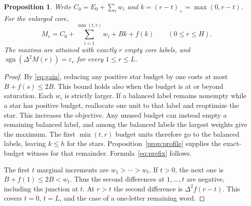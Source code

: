 \documentclass[11pt]{article}
\newtheorem{proposition}[theorem]{Proposition}
\theoremstyle{definition}\newtheorem{example}[theorem]{Example}
\newcommand{\sig}{\operatorname{sgn}}
\newcommand{\Dtwo}{\Delta^2}
\begin{document}
\begin{proposition}\label{prop:prefix}
Write $C_0=E_0+\sum_i w_i$ and $k=(r-t)_+=\max(0,r-t)$. For the enlarged core,
\begin{equation}\label{eq:prefix}
 M_r=C_0+\sum_{i=1}^{\min(t,r)}w_i+Bk+f(k)\qquad(0\le r\le H).
\end{equation}
The maxima are attained with exactly $r$ empty core labels, and $\sig(\Dtwo M(r))=\varepsilon_r$ for every $1\le r\le L$.
\end{proposition}
\begin{proof}
By \eqref{eq:gain}, reducing any positive star budget by one costs at most $B+f(s)\le2B$. This bound holds also when the budget is at or beyond saturation. Each $w_i$ is strictly larger. If a balanced label remains nonempty while a star has positive budget, reallocate one unit to that label and reoptimize the star. This increases the objective. Any unused budget can instead empty a remaining balanced label, and among the balanced labels the largest weights give the maximum. The first $\min(t,r)$ budget units therefore go to the balanced labels, leaving $k\le h$ for the stars. Proposition~\ref{prop:profile} supplies the exact-budget witness for that remainder. Formula~\eqref{eq:prefix} follows.

The first $t$ marginal increments are $w_1>\cdots>w_t$. If $t>0$, the next one is $B+f(1)\le2B<w_t$. Thus the second differences at $1,\ldots,t$ are negative, including the junction at $t$. At $r>t$ the second difference is $\Dtwo f(r-t)$. This covers $t=0$, $t=L$, and the case of a one-letter remaining word.\end{proof}
\end{document}
